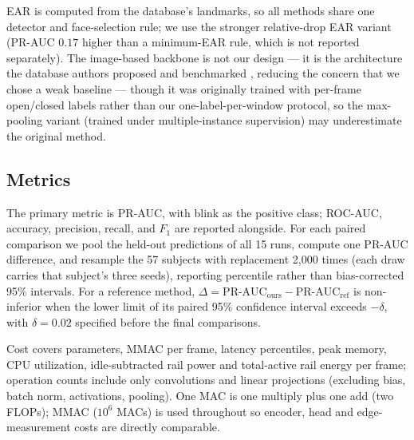 \documentclass{IEEEmce}
\begin{document}
EAR is computed from the database's landmarks, so all methods share one detector and
face-selection rule; we use the stronger relative-drop EAR variant (PR-AUC $0.17$ higher
than a minimum-EAR rule, which is not reported separately). The image-based backbone is
not our design --- it is the architecture the database authors proposed and benchmarked
\cite{daza2020}, reducing the concern that we chose a weak baseline --- though it was
originally trained with per-frame open/closed labels rather than our
one-label-per-window protocol, so the max-pooling variant (trained under
multiple-instance supervision) may underestimate the original method.

\subsection{Metrics}
The primary metric is PR-AUC, with blink as the positive class; ROC-AUC, accuracy,
precision, recall, and $F_1$ are reported alongside. For each paired comparison we pool
the held-out predictions of all 15 runs, compute one PR-AUC difference, and resample the
57 subjects with replacement 2,000 times (each draw carries that subject's three seeds),
reporting percentile rather than bias-corrected 95\% intervals. For a reference method,
$\Delta=\mathrm{PR\mbox{-}AUC}_{\mathrm{ours}}- \mathrm{PR\mbox{-}AUC}_{\mathrm{ref}}$
is non-inferior when the lower limit of its paired 95\% confidence interval exceeds
$-\delta$, with $\delta=0.02$ specified before the final comparisons.

Cost covers parameters, MMAC per frame, latency percentiles, peak memory, CPU
utilization, idle-subtracted rail power and total-active rail energy per frame; operation counts include
only convolutions and linear projections (excluding bias, batch norm, activations,
pooling). One MAC is one multiply plus one add (two FLOPs); MMAC ($10^6$ MACs) is used
throughout so encoder, head and edge-measurement costs are directly comparable.
\end{document}
